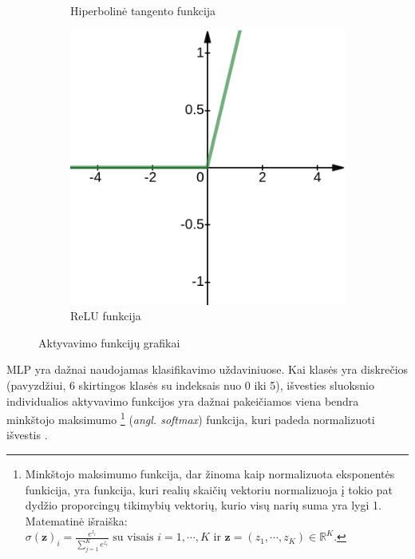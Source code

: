 \documentclass{VUMIFPSbakalaurinis}
\begin{document}
{\begin{figure}[H]
\begin{subfigure}[b]{.333\textwidth}
			\caption{Hiperbolinė tangento funkcija }
			\label{img:tanh_graph}
		\end{subfigure}%
		\begin{subfigure}[b]{.333\textwidth}
			\centering
			\includegraphics[width=.75\textwidth]{img/relu_graph}
			\caption{ReLU funkcija }
			\label{img:relu_graph}
		\end{subfigure}%
		\caption{Aktyvavimo funkcijų grafikai}
		\label{img:activation_graphs}
	\end{figure} 
	MLP yra dažnai naudojamas klasifikavimo uždaviniuose. Kai klasės yra diskrečios (pavyzdžiui, 6 skirtingos klasės su indeksais nuo 0 iki 5), išvesties sluoksnio individualios aktyvavimo funkcijos yra dažnai pakeičiamos viena bendra minkštojo maksimumo
	\footnote{Minkštojo maksimumo funkcija, dar žinoma kaip normalizuota eksponentės funkicija, yra funkcija, kuri realių skaičių vektoriu normalizuoja į tokio pat dydžio proporcingų tikimybių vektorių, kurio visų narių suma yra lygi 1. Matematinė išraiška: \(\sigma(\mathbf{z})_i = \frac{e^{z_i}}{\sum_{j=1}^K e^{z_i}} \textrm{ su visais } i = 1, \cdots, K \textrm{ ir } \mathbf{z} = (z_1, \cdots, z_K) \in \mathbb{R}^K \).}
	(\textit{angl. softmax}) funkcija, kuri padeda normalizuoti išvestis \cite{handson}.
}
\end{document}
